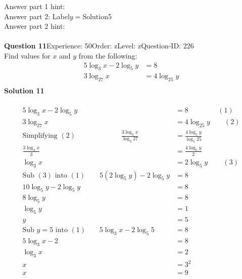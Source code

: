 \documentclass{article}
\begin{document}
Answer part 1 hint: \hspace{15pt}\\
Answer part 2: \hspace{10pt}Label\hspace{10pt}$y=$\hspace{10pt}Solution\hspace{10pt}5\\
Answer part 2 hint: \hspace{15pt}\\
\\[4pt]
\noindent\textbf{Question 11}\hspace{20pt}Experience: 50\hspace{20pt}Order: z\hspace{20pt}Level: z\hspace{20pt}Question-ID: 226\\[2pt]
Find values for $x$ and $y$ from the following:
\begin{align*}
5\log_{3}x-2\log_{5}y&=8\\[2pt]
3\log_{27}x&=4\log_{25}y\\[-22pt]
\end{align*}
\noindent\textbf{Solution 11}\\[2pt]
\\[-35pt]\begin{align*}
5\log_{3}x-2\log_{5}y&=8\hspace{50pt} (1)\\[2pt]
3\log_{27}x&=4\log_{25}y\qquad (2)\\[2pt]
\text{Simplifying} \,\,(2) \hspace{77pt} \displaystyle\frac{3\log_{3}x}{\log_{3}27}&=\displaystyle\frac{4\log_{5}y}{\log_{5}25}\\[2pt]
\displaystyle\frac{3\log_{3}x}{3}&=\displaystyle\frac{4\log_{5}y}{2}\\[2pt]
\log_{3}x&=2\log_{5}y\hspace{26pt} (3)\\[2pt]
\text{Sub}\,\,(3)\,\, \text{into}\,\,(1)\qquad 5(2\log_{5}y)-2\log_{5}y&=8\\[2pt]
10\log_{5}y-2\log_{5}y&=8\\[2pt]
8\log_{5}y&=8\\[2pt]
\log_{5}y&=1\\[2pt]
y&=5\\[12pt]
\text{Sub}\,\,y=5\,\,\text{into}\,\,(1)\hspace{23pt} 5\log_{3}x-2\log_{5}5&=8\\[2pt]
5\log_{3}x-2&=8\\[2pt]
\log_{3}x&=2\\[2pt]
x&=3^2\\[2pt]
x&=9
\end{align*}
\end{document}
